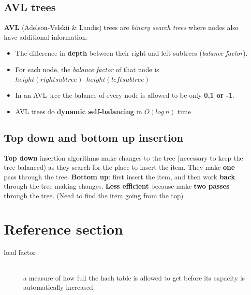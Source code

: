 \documentclass{article}
\begin{document}
	\subsection{AVL trees}
	\begin{flushleft}
		\textbf{AVL} (Adelson-Velskii \& Landis) trees are \textit{binary search trees} where nodes also have additional information:
		\begin{itemize}
			\item The difference in \textbf{depth} between their right and left subtrees (\textit{balance factor}). 
			\item For each node, the \textit{balance factor} of that node is $height(right subtree) – height( left subtree )$ 
			\item In an AVL tree the balance of every node is allowed to be only \textbf{0,1 or -1}.
			\item AVL trees do \textbf{dynamic self-balancing} in $O(log \: n)$ time
		\end{itemize}
	\end{flushleft}	

	\subsection{Top down and bottom up insertion}	
	\begin{flushleft}
		\textbf{Top down} insertion algorithms make changes to the tree (necessary to keep the tree balanced) as they search for the place to insert the item. They make \textbf{one} pass through the tree. \textbf{Bottom up}: first insert the item, and then work \textbf{back} through the tree making changes. \textbf{Less efficient} because make \textbf{two passes} through the tree. (Need to find the item going from the top)
	\end{flushleft}	
	
	\pagebreak
	\section*{Reference section} \label{sec:reference}
	\begin{description}
		\item[load factor] \hfill \\ a measure of how full the hash table is allowed to get before its capacity is automatically increased.
	\end{description}
\end{document}
